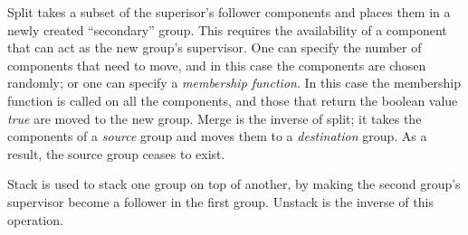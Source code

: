 Split takes a subset of the superisor's follower components and places them in a newly created ``secondary'' group. This requires the availability of a component that can act as the new group's supervisor. One can specify the number of components that need to move, and in this case the components are chosen randomly; or one can specify a \emph{membership function}. In this case the membership function is called on all the components, and those that return the boolean value \emph{true} are moved to the new group. Merge is the inverse of split; it takes the components of a \emph{source} group and moves them to a \emph{destination} group. As a result, the source group ceases to exist.

Stack is used to stack one group on top of another, by making the second group's supervisor become a follower in the first group. Unstack is the inverse of this operation. 






